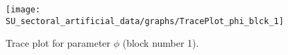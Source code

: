 \begin{figure}[H]
\centering
  \texttt{[image: SU\_sectoral\_artificial\_data/graphs/TracePlot\_phi\_blck\_1]}\\
    \caption{Trace plot for parameter ${\phi}$ (block number 1).}
\end{figure}
